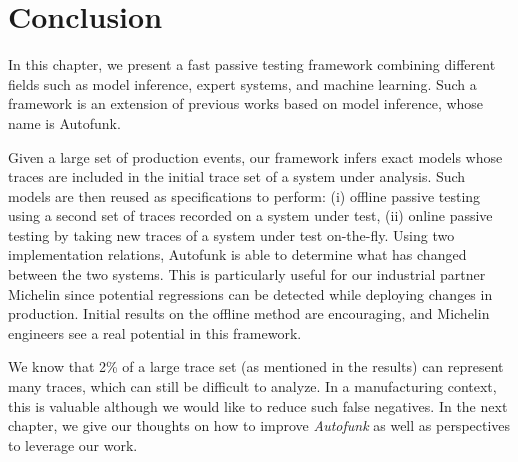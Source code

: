 \section{Conclusion}
\label{sec:testing:conclusion}

In this chapter, we present a fast passive testing framework
combining different fields such as model inference, expert
systems, and machine learning. Such a framework is an extension
of previous works based on model inference, whose name is
Autofunk.

Given a large set of production events, our framework infers
exact models whose traces are included in the initial trace set
of a system under analysis. Such models are then reused as
specifications to perform: (i) offline passive testing using a
second set of traces recorded on a system under test, (ii) online
passive testing by taking new traces of a system under test
on-the-fly. Using two implementation relations, Autofunk is able
to determine what has changed between the two systems. This is
particularly useful for our industrial partner Michelin since
potential regressions can be detected while deploying changes in
production. Initial results on the offline method are
encouraging, and Michelin engineers see a real potential in this
framework.

We know that 2\% of a large trace set (as mentioned in the
results) can represent many traces, which can still be difficult
to analyze. In a manufacturing context, this is valuable although
we would like to reduce such false negatives. In the next
chapter, we give our thoughts on how to improve \textit{Autofunk}
as well as perspectives to leverage our work.
